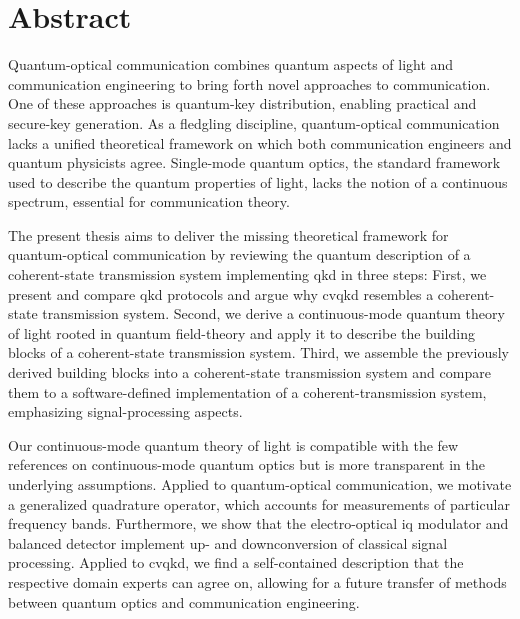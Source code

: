 \section*{Abstract}

Quantum-optical communication combines quantum aspects of light and communication engineering to bring forth novel approaches to communication.
One of these approaches is quantum-key distribution, enabling practical and secure-key generation.
As a fledgling discipline, quantum-optical communication lacks a unified theoretical framework on which both communication engineers and quantum physicists agree.
Single-mode quantum optics, the standard framework used to describe the quantum properties of light, lacks the notion of a continuous spectrum, essential for communication theory.

The present thesis aims to deliver the missing theoretical framework for quantum-optical communication by reviewing the quantum description of a coherent-state transmission system implementing \gls{qkd} in three steps:
First, we present and compare \gls{qkd} protocols and argue why \gls{cvqkd} resembles a coherent-state transmission system.
Second, we derive a continuous-mode quantum theory of light rooted in quantum field-theory and apply it to describe the building blocks of a coherent-state transmission system.
Third, we assemble the previously derived building blocks into a coherent-state transmission system and compare them to a software-defined implementation of a coherent-transmission system, emphasizing signal-processing aspects.

Our continuous-mode quantum theory of light is compatible with the few references on continuous-mode quantum optics but is more transparent in the underlying assumptions.
Applied to quantum-optical communication, we motivate a generalized quadrature operator, which accounts for measurements of particular frequency bands.
Furthermore, we show that the electro-optical \gls{iq} modulator and balanced detector implement up- and downconversion of classical signal processing.
Applied to \gls{cvqkd}, we find a self-contained description that the respective domain experts can agree on, allowing for a future transfer of methods between quantum optics and communication engineering.